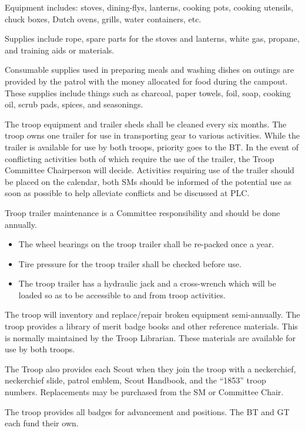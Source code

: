 \documentclass{ltxguide}
\begin{document}
Equipment includes: stoves, dining-flys, lanterns, cooking pots, cooking utensils, chuck boxes, Dutch ovens, grills, water containers, etc.

Supplies include rope, spare parts for the stoves and lanterns, white gas, propane, and training aids or materials.

Consumable supplies used in preparing meals and washing dishes on outings are provided by the patrol with the money allocated for food during the campout. These supplies include things such as charcoal, paper towels, foil, soap, cooking oil, scrub pads, spices, and seasonings.

The troop equipment and trailer sheds shall be cleaned every six months. 
The troop owns one trailer for use in transporting gear to various activities. While the trailer is available for use by both troops, priority goes to the \ac{BT}. In the event of conflicting activities both of which require the use of the trailer, the Troop Committee Chairperson will decide. Activities requiring use of the trailer should be placed on the calendar, both \acp{SM} should be informed of the potential use as soon as possible to help alleviate conflicts and be discussed at \ac{PLC}.

Troop trailer maintenance is a Committee responsibility and should be done annually.

\begin{itemize}
	\item The wheel bearings on the troop trailer shall be re-packed once a year.
	\item Tire pressure for the troop trailer shall be checked before use.
	\item The troop trailer has a hydraulic jack and a cross-wrench which will be loaded so as to be accessible to and from troop activities.
\end{itemize}

The troop will inventory and replace/repair broken equipment semi-annually.
The troop provides a library of merit badge books and other reference materials. This is normally maintained by the Troop Librarian. These materials are available for use by both troops.

The Troop also provides each Scout when they join the troop with a neckerchief, neckerchief slide, patrol emblem, Scout Handbook, and the “1853” troop numbers. Replacements may be purchased from the \ac{SM} or Committee Chair.

The troop provides all badges for advancement and positions. The BT and GT each fund their own.
\end{document}
